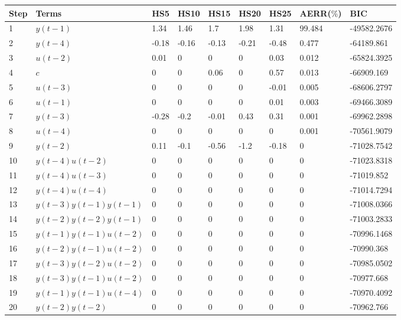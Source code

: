 \begin{tabular}{lllllllll}
Step & Terms & HS5 & HS10 & HS15 & HS20 & HS25 & AERR($\%$) & BIC \\ 
\hline 
1 & $y(t-1)$ & 1.34 & 1.46 & 1.7 & 1.98 & 1.31 & 99.484 & -49582.2676 \\ 
2 & $y(t-4)$ & -0.18 & -0.16 & -0.13 & -0.21 & -0.48 & 0.477 & -64189.861 \\ 
3 & $u(t-2)$ & 0.01 & 0 & 0 & 0 & 0.03 & 0.012 & -65824.3925 \\ 
4 & $c$ & 0 & 0 & 0.06 & 0 & 0.57 & 0.013 & -66909.169 \\ 
5 & $u(t-3)$ & 0 & 0 & 0 & 0 & -0.01 & 0.005 & -68606.2797 \\ 
6 & $u(t-1)$ & 0 & 0 & 0 & 0 & 0.01 & 0.003 & -69466.3089 \\ 
7 & $y(t-3)$ & -0.28 & -0.2 & -0.01 & 0.43 & 0.31 & 0.001 & -69962.2898 \\ 
8 & $u(t-4)$ & 0 & 0 & 0 & 0 & 0 & 0.001 & -70561.9079 \\ 
9 & $y(t-2)$ & 0.11 & -0.1 & -0.56 & -1.2 & -0.18 & 0 & -71028.7542 \\ 
10 & $y(t-4)u(t-2)$ & 0 & 0 & 0 & 0 & 0 & 0 & -71023.8318 \\ 
11 & $y(t-4)u(t-3)$ & 0 & 0 & 0 & 0 & 0 & 0 & -71019.852 \\ 
12 & $y(t-4)u(t-4)$ & 0 & 0 & 0 & 0 & 0 & 0 & -71014.7294 \\ 
13 & $y(t-3)y(t-1)y(t-1)$ & 0 & 0 & 0 & 0 & 0 & 0 & -71008.0366 \\ 
14 & $y(t-2)y(t-2)y(t-1)$ & 0 & 0 & 0 & 0 & 0 & 0 & -71003.2833 \\ 
15 & $y(t-1)y(t-1)u(t-2)$ & 0 & 0 & 0 & 0 & 0 & 0 & -70996.1468 \\ 
16 & $y(t-2)y(t-1)u(t-2)$ & 0 & 0 & 0 & 0 & 0 & 0 & -70990.368 \\ 
17 & $y(t-3)y(t-2)u(t-2)$ & 0 & 0 & 0 & 0 & 0 & 0 & -70985.0502 \\ 
18 & $y(t-3)y(t-1)u(t-2)$ & 0 & 0 & 0 & 0 & 0 & 0 & -70977.668 \\ 
19 & $y(t-1)y(t-1)u(t-4)$ & 0 & 0 & 0 & 0 & 0 & 0 & -70970.4092 \\ 
20 & $y(t-2)y(t-2)$ & 0 & 0 & 0 & 0 & 0 & 0 & -70962.766 \\ 
\hline 
\end{tabular}